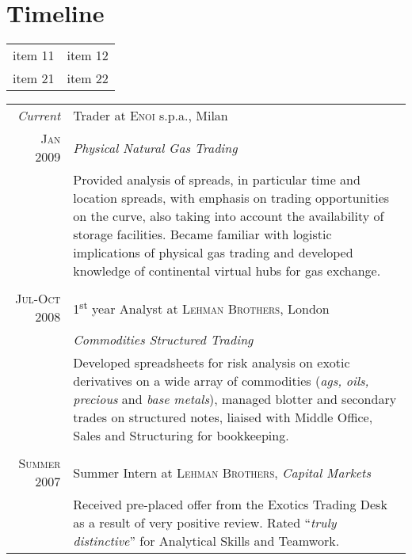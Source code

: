 \section{Timeline}

\setlength{\arrayrulewidth}{0.25pt}
\setlength{\tabcolsep}{18pt}
\begin{tabularx}{1\textwidth} { 
  >{\raggedright\arraybackslash}X 
  | >{\raggedright\arraybackslash}X }
 item 11 & item 12 \\
 item 21  & item 22  \\
\end{tabularx}

\setlength{\tabcolsep}{10pt}
\begin{tabular}{r|p{11cm}}
 \emph{Current} & Trader at \textsc{Enoi} s.p.a., Milan \\\textsc{Jan 2009}&\emph{Physical Natural Gas Trading}\\&\footnotesize{Provided analysis of spreads, in particular time and location spreads, with emphasis on trading opportunities on the curve, also taking into account the availability of storage facilities. Became familiar with logistic implications of physical gas trading and developed knowledge of continental virtual hubs for gas exchange.}\\\multicolumn{2}{c}{} \\
 \textsc{Jul-Oct 2008} & 1\textsuperscript{st} year Analyst at \textsc{Lehman Brothers}, London \\&\emph{Commodities Structured Trading}\\&\footnotesize{Developed spreadsheets for risk analysis on exotic derivatives on a wide array of commodities (\textit{ags, oils, precious} and \textit{base metals}), managed blotter and secondary trades on structured notes, liaised with Middle Office, Sales and Structuring for bookkeeping.}\\\multicolumn{2}{c}{} \\
\textsc{Summer 2007} & Summer Intern at \textsc{Lehman Brothers}, \emph{Capital Markets}\\&\footnotesize{Received pre-placed offer from the Exotics Trading Desk as a result of very positive review. Rated ``\emph{truly distinctive}'' for Analytical Skills and Teamwork.}
\end{tabular}

\newlength{\datecolumn}
\setlength{\datecolumn}{2.5cm} %

